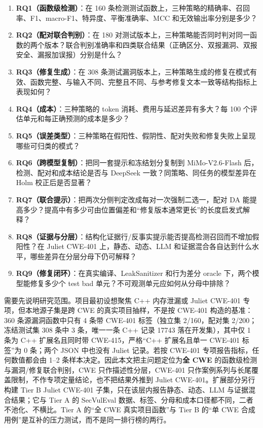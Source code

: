 \documentclass[conference]{IEEEtran}
\begin{document}
\begin{enumerate}
    \item \textbf{RQ1（函数级检测）}：在 160 条检测测试函数上，三种策略的精确率、召回率、F1、macro-F1、特异度、平衡准确率、MCC 和无效输出率分别是多少？
    \item \textbf{RQ2（配对联合判别）}：在 180 对测试版本上，三种策略能否同时判对同一函数的两个版本？联合判别准确率和四类联合结果（正确区分、双报漏洞、双报安全、漏报加误报）分别是什么？
    \item \textbf{RQ3（修复生成）}：在 308 条测试漏洞版本上，三种策略生成的修复在模式有效、函数完整、与输入不同、完整且不同、与参考修复文本一致等结构指标上表现如何？
    \item \textbf{RQ4（成本）}：三种策略的 token 消耗、费用与延迟差异有多大？每 100 个评估单元和每正确预测的成本是多少？
    \item \textbf{RQ5（误差类型）}：三种策略在假阳性、假阴性、配对失败和修复失败上呈现哪些可归类的模式？
    \item \textbf{RQ6（跨模型复制）}：把同一套提示和冻结划分复制到 MiMo-V2.6-Flash 后，检测、配对和成本结论是否与 DeepSeek 一致？同策略、同任务的模型差异在 Holm 校正后是否显著？
    \item \textbf{RQ7（联合提示）}：把两次分侧判定改成每对一次强制二选一，配对 DA 能提高多少？提高中有多少可由位置偏差和“修复版本通常更长”的长度启发式解释？
    \item \textbf{RQ8（证据与分层）}：结构化证据行/反事实提示能否提高检测召回而不增加假阳性？在 Juliet CWE-401 上，静态、动态、LLM 和证据混合各自达到什么水平，哪些差异在分层分母下仍可解释？
    \item \textbf{RQ9（修复闭环）}：在真实编译、LeakSanitizer 和行为差分 oracle 下，两个模型能修复多少个 test bad 单元？不可观测单元应如何从分母中排除？
\end{enumerate}

需要先说明研究范围。项目最初设想聚焦 C++ 内存泄漏或 Juliet CWE-401 专项，但本地源子集是跨 CWE 的真实项目抽样，不是按 CWE-401 构造的基准：360 条源漏洞函数中只有 4 条带 CWE-401 标签（独立集 2/160，配对集 2/200；冻结测试集 308 条中 3 条，唯一一条 C++ 记录 17743 落在开发集），其中仅 1 条为 C++ 扩展名且同时带 CWE-415，严格“C++ 扩展名且单一 CWE-401 标签”为 0 条；两个 JSON 中也没有 Juliet 记录。若按 CWE-401 专项报告指标，任何数值都会由 1--2 条样本决定。因此本文把主问题定位为\textbf{全 CWE} 的函数级检测与漏洞/修复联合判别，CWE 只作描述性分层，CWE-401 只作案例系列与长尾覆盖限制，不作专项定量结论，也不把结果外推到 Juliet CWE-401。扩展部分另行构建 Tier B Juliet CWE-401 子集，只在该层内报告静态、动态、LLM 与证据混合结果；它与 Tier A 的 SecVulEval 数据、标签、分母和成本口径都不同，二者不池化、不横比。Tier A 的“全 CWE 真实项目函数”与 Tier B 的“单 CWE 合成用例”是互补的压力测试，而不是同一排行榜的两行。
\end{document}
